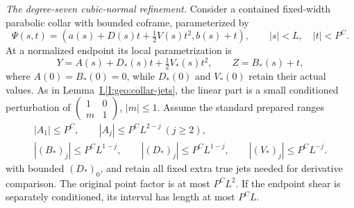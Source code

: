 \documentclass[11pt]{amsart}
\theoremstyle{definition}
\theoremstyle{remark}
\numberwithin{equation}{section}
\newcommand{\partIref}[1]{\hyperref[I:#1]{I.\ref*{I:#1}}}
\begin{document}
\emph{The degree-seven cubic-normal refinement.} Consider a contained fixed-width parabolic collar with bounded coframe, parameterized by
\[
\Psi(s,t)=\left(a(s)+D(s)t+\tfrac12V(s)t^2,b(s)+t\right),\qquad |s|<L,\quad |t|<P^C.
\]
At a normalized endpoint its local parametrization is
\[
Y=A(s)+D_*(s)t+\tfrac12V_*(s)t^2,\qquad Z=B_*(s)+t,
\]
where $A(0)=B_*(0)=0$, while $D_*(0)$ and $V_*(0)$ retain their actual values. As in Lemma~\partIref{geo:collar-jets}, the linear part is a small conditioned perturbation of $\left(\begin{smallmatrix}1&0\\m&1\end{smallmatrix}\right)$, $|m|\le1$. Assume the standard prepared ranges
\[
\begin{gathered}
|A_1|\le P^C,\qquad |A_j|\le P^CL^{2-j}\ (j\ge2),\\
|(B_*)_j|\le P^CL^{1-j},\qquad |(D_*)_j|\le P^CL^{1-j},\qquad |(V_*)_j|\le P^CL^{-j}.
\end{gathered}
\]
with bounded $(D_*)_0$, and retain all fixed extra true jets needed for derivative comparison. The original point factor is at most $P^CL^2$. If the endpoint shear is separately conditioned, its interval has length at most $P^CL$.
\end{document}
